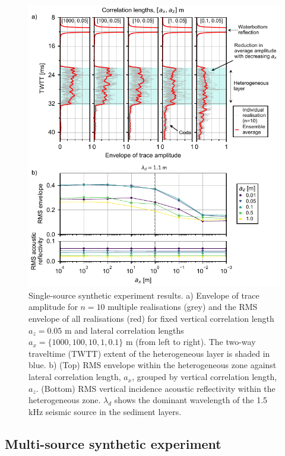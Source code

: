 \documentclass[se,manuscript]{copernicus}
\begin{document}
\begin{figure}
    \includegraphics{figures/fig04.pdf}
    \caption{Single-source synthetic experiment results.
        a) Envelope of trace amplitude for $n=10$ multiple realisations (grey) and the RMS envelope of all realisations (red) for fixed vertical correlation length $a_z=0.05$ m and lateral correlation lengths $a_x=\{1000, 100, 10, 1, 0.1\}$ \unit{m} (from left to right).
        The two-way traveltime (TWTT) extent of the heterogeneous layer is shaded in blue.
        b) (Top) RMS envelope within the heterogeneous zone against lateral correlation length, $a_x$, grouped by vertical correlation length, $a_z$.
        (Bottom) RMS vertical incidence acoustic reflectivity within the heterogeneous zone.
        $\lambda_d$ shows the dominant wavelength of the 1.5 \unit{kHz} seismic source in the sediment layers.}
    \label{fig:single-source-results}
\end{figure}

\subsection{Multi-source synthetic experiment}
\label{sec:multi-source-results}
\end{document}
